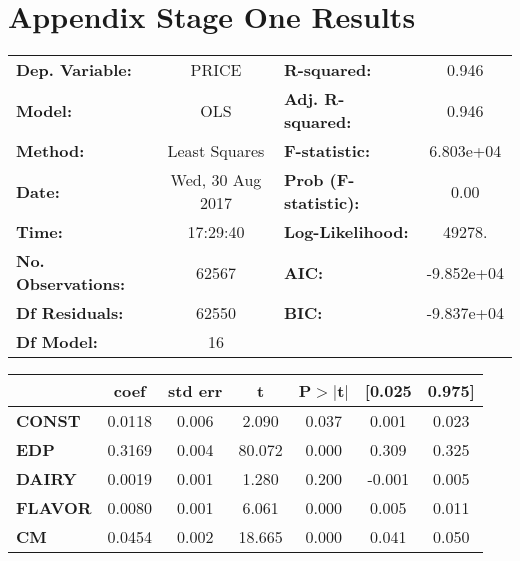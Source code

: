 \documentclass{article}
\begin{document}
\section{Appendix Stage One Results}

\begin{center}
\begin{tabular}{lclc}
\toprule
\textbf{Dep. Variable:}    &        PRICE         & \textbf{  R-squared:         } &     0.946   \\
\textbf{Model:}            &       OLS        & \textbf{  Adj. R-squared:    } &     0.946   \\
\textbf{Method:}           &  Least Squares   & \textbf{  F-statistic:       } & 6.803e+04   \\
\textbf{Date:}             & Wed, 30 Aug 2017 & \textbf{  Prob (F-statistic):} &     0.00    \\
\textbf{Time:}             &     17:29:40     & \textbf{  Log-Likelihood:    } &    49278.   \\
\textbf{No. Observations:} &       62567      & \textbf{  AIC:               } & -9.852e+04  \\
\textbf{Df Residuals:}     &       62550      & \textbf{  BIC:               } & -9.837e+04  \\
\textbf{Df Model:}         &          16      & \textbf{                     } &             \\
\bottomrule
\end{tabular}
\begin{tabular}{lcccccc}
               & \textbf{coef} & \textbf{std err} & \textbf{t} & \textbf{P$>$$|$t$|$} & \textbf{[0.025} & \textbf{0.975]}  \\
\midrule
\textbf{CONST} &       0.0118  &        0.006     &     2.090  &         0.037        &        0.001    &        0.023     \\
\textbf{EDP}    &       0.3169  &        0.004     &    80.072  &         0.000        &        0.309    &        0.325     \\
\textbf{DAIRY}    &       0.0019  &        0.001     &     1.280  &         0.200        &       -0.001    &        0.005     \\
\textbf{FLAVOR}    &       0.0080  &        0.001     &     6.061  &         0.000        &        0.005    &        0.011     \\
\textbf{CM}    &       0.0454  &        0.002     &    18.665  &         0.000        &        0.041    &        0.050     \\

\end{tabular}
\end{center}
\end{document}
